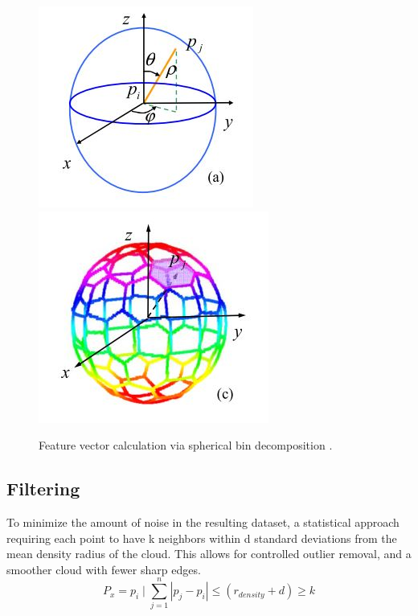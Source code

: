\documentclass[12pt]{drexelthesis}
\let\Oldsubsection\subsection
\renewcommand{\subsection}{\FloatBarrier\Oldsubsection}
\begin{document}
\begin{figure}[!ht]
	\centering
		\includegraphics{ISSfeaturevector2.jpg}  \includegraphics{ISSfeaturevector.jpg}
	\caption[Intrinsic Shape Signature feature vectors]{\centering Feature vector calculation via spherical bin decomposition \cite{RN60}.}
\end{figure}

\subsection{Filtering}
To minimize the amount of noise in the resulting dataset, a statistical approach requiring each point to have k neighbors within d standard deviations from the mean density radius of the cloud. This allows for controlled outlier removal, and a smoother cloud with fewer sharp edges.
\begin{equation}
	P_{x} = p_{i} \mid \sum_{j=1}^n |p_{j} - p_{i}| \leq (r_{density} + d) \geq k
\end{equation}
\end{document}
